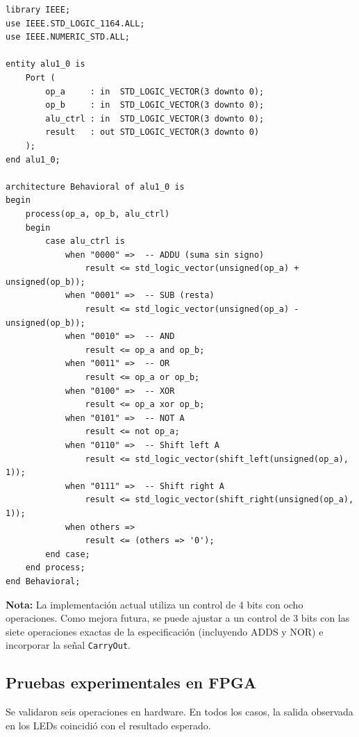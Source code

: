 \documentclass[12pt,letterpaper]{article}
\begin{document}
\begin{lstlisting}[caption={Descripción VHDL de la ALU de 4 bits (\texttt{alu1\_0.vhd}).}, label={lst:alu}]
library IEEE;
use IEEE.STD_LOGIC_1164.ALL;
use IEEE.NUMERIC_STD.ALL;

entity alu1_0 is
    Port (
        op_a     : in  STD_LOGIC_VECTOR(3 downto 0);
        op_b     : in  STD_LOGIC_VECTOR(3 downto 0);
        alu_ctrl : in  STD_LOGIC_VECTOR(3 downto 0);
        result   : out STD_LOGIC_VECTOR(3 downto 0)
    );
end alu1_0;

architecture Behavioral of alu1_0 is
begin
    process(op_a, op_b, alu_ctrl)
    begin
        case alu_ctrl is
            when "0000" =>  -- ADDU (suma sin signo)
                result <= std_logic_vector(unsigned(op_a) + unsigned(op_b));
            when "0001" =>  -- SUB (resta)
                result <= std_logic_vector(unsigned(op_a) - unsigned(op_b));
            when "0010" =>  -- AND
                result <= op_a and op_b;
            when "0011" =>  -- OR
                result <= op_a or op_b;
            when "0100" =>  -- XOR
                result <= op_a xor op_b;
            when "0101" =>  -- NOT A
                result <= not op_a;
            when "0110" =>  -- Shift left A
                result <= std_logic_vector(shift_left(unsigned(op_a), 1));
            when "0111" =>  -- Shift right A
                result <= std_logic_vector(shift_right(unsigned(op_a), 1));
            when others =>
                result <= (others => '0');
        end case;
    end process;
end Behavioral;
\end{lstlisting}

\textbf{Nota:} La implementación actual utiliza un control de 4 bits con ocho operaciones.
Como mejora futura, se puede ajustar a un control de 3 bits con las siete operaciones exactas de la especificación (incluyendo ADDS y NOR) e incorporar la señal \texttt{CarryOut}.

\subsection{Pruebas experimentales en FPGA}
Se validaron seis operaciones en hardware.
En todos los casos, la salida observada en los LEDs coincidió con el resultado esperado.
\end{document}
